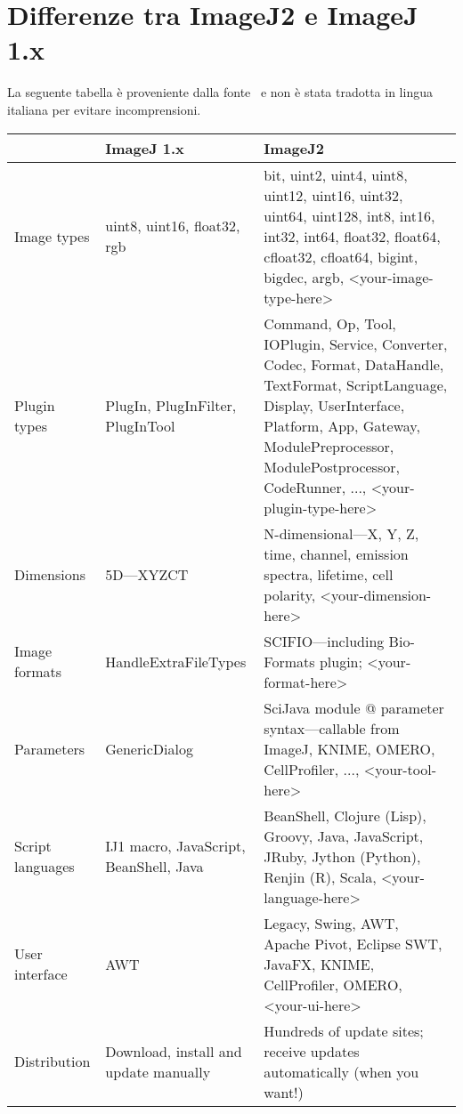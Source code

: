 \section{Differenze tra ImageJ2 e ImageJ 1.x}
\noindent La seguente tabella è proveniente dalla fonte~\cite{CheatSheet} e non è stata tradotta in lingua italiana per evitare incomprensioni.
\begin{table}[H]
\begin{tabularx}{\textwidth}{|l|X|X|}
\hline
\small{} &
\small{ImageJ 1.x} & 
\small{ImageJ2} \\
\hline
Image types & uint8, uint16, float32, rgb &	bit, uint2, uint4, uint8, uint12, uint16, uint32, uint64, uint128, int8, int16, int32, int64, float32, float64, cfloat32, cfloat64, bigint, bigdec, argb, <your-image-type-here> \\
\hline
Plugin types & PlugIn, PlugInFilter, PlugInTool & Command, Op, Tool, IOPlugin, Service, Converter, Codec, Format, DataHandle, TextFormat, ScriptLanguage, Display, UserInterface, Platform, App, Gateway, ModulePreprocessor, ModulePostprocessor, CodeRunner, ..., <your-plugin-type-here> \\
\hline
Dimensions & 5D—XYZCT &	N-dimensional—X, Y, Z, time, channel, emission spectra, lifetime, cell polarity, <your-dimension-here> \\
\hline
Image formats & HandleExtraFileTypes & SCIFIO—including Bio-Formats plugin; <your-format-here> \\
\hline
Parameters & GenericDialog & SciJava module @ parameter syntax—callable from ImageJ, KNIME, OMERO, CellProfiler, ..., <your-tool-here> \\
\hline
Script languages & IJ1 macro, JavaScript, BeanShell, Java &	BeanShell, Clojure (Lisp), Groovy, Java, JavaScript, JRuby, Jython (Python), Renjin (R), Scala, <your-language-here>\\
\hline
User interface & AWT & Legacy, Swing, AWT, Apache Pivot, Eclipse SWT, JavaFX, KNIME, CellProfiler, OMERO, <your-ui-here> \\
\hline
Distribution & Download, install and update manually & Hundreds of update sites; receive updates automatically (when you want!) \\
\hline
\end{tabularx}
\end{table}

